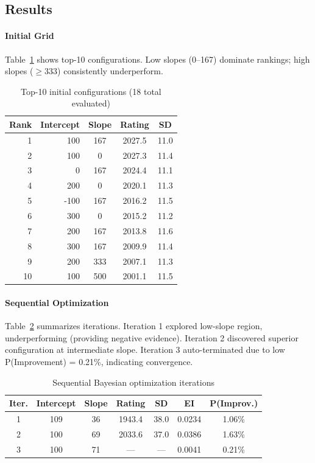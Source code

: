   \subsection{Results}

  \paragraph{Initial Grid} Table~\ref{tab:task7_grid} shows top-10 configurations. Low slopes (0--167) dominate rankings; high slopes ($\geq 333$) consistently underperform.

  \begin{table}[H]
  \centering
  \caption{Top-10 initial configurations (18 total evaluated)}
  \label{tab:task7_grid}
  \begin{tabular}{rrccc}
  \hline
  \textbf{Rank} & \textbf{Intercept} & \textbf{Slope} & \textbf{Rating} & \textbf{SD} \\
  \hline
  1  & 100  & 167 & 2027.5 & 11.0 \\
  2  & 100  & 0   & 2027.3 & 11.4 \\
  3  & 0    & 167 & 2024.4 & 11.1 \\
  4  & 200  & 0   & 2020.1 & 11.3 \\
  5  & -100 & 167 & 2016.2 & 11.5 \\
  6  & 300  & 0   & 2015.2 & 11.2 \\
  7  & 200  & 167 & 2013.8 & 11.6 \\
  8  & 300  & 167 & 2009.9 & 11.4 \\
  9  & 200  & 333 & 2007.1 & 11.3 \\
  10 & 100  & 500 & 2001.1 & 11.5 \\
  \hline
  \end{tabular}
  \end{table}

  \paragraph{Sequential Optimization} Table~\ref{tab:sequential} summarizes iterations. Iteration 1 explored low-slope region, underperforming (providing negative evidence).
  Iteration 2 discovered superior configuration at intermediate slope. Iteration 3 auto-terminated due to low P(Improvement) = 0.21\%, indicating convergence.

  \begin{table}[H]
  \centering
  \caption{Sequential Bayesian optimization iterations}
  \label{tab:sequential}
  \begin{tabular}{ccccccc}
  \hline
  \textbf{Iter.} & \textbf{Intercept} & \textbf{Slope} & \textbf{Rating} & \textbf{SD} & \textbf{EI} & \textbf{P(Improv.)} \\
  \hline
  1 & 109 & 36  & 1943.4 & 38.0 & 0.0234 & 1.06\% \\
  2 & 100 & 69  & 2033.6 & 37.0 & 0.0386 & 1.63\% \\
  3 & 100 & 71  & ---    & ---  & 0.0041 & 0.21\% \\
  \hline
  \end{tabular}
  \end{table}

